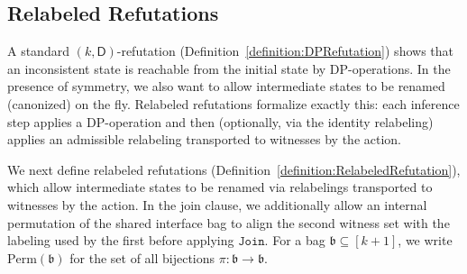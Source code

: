\documentclass[11pt,a4paper]{article}
\newcommand{\treewidthvalue}{k}
\newcommand{\abag}{\mathfrak{b}}
\newcommand{\jointype}{\mathtt{Join}}
\newcommand{\allwitnesses}{\mathcal{W}}
\newcommand{\dpcore}{\mathsf{D}}
\newcommand{\witnessset}{S}
\newcommand{\decompositionclass}{\mathsf{C}}
\newcommand{\realizationclass}{\mathcal{A}}
\newcommand{\relabelingfunction}{f}
\newcommand{\relabelclass}{\mathcal{F}}
\newcommand{\action}{\rho}
\newcommand{\relabelpair}{\rho}
\begin{document}
\subsection{Relabeled Refutations}

A standard $(\treewidthvalue,\dpcore)$-refutation (Definition~\ref{definition:DPRefutation}) shows that an inconsistent state is reachable from the initial state by DP-operations. In the presence of symmetry, we also want to allow intermediate states to be renamed (canonized) on the fly. Relabeled refutations formalize exactly this: each inference step applies a DP-operation and then (optionally, via the identity relabeling) applies an admissible relabeling transported to witnesses by the action.



We next define relabeled refutations (Definition~\ref{definition:RelabeledRefutation}), which allow intermediate states to be renamed via relabelings transported to witnesses by the action.
In the join clause, we additionally allow an internal permutation of the shared interface bag to align the second witness set with the labeling used by the first before applying $\jointype$.
For a bag $\abag\subseteq [\treewidthvalue+1]$, we write $\mathrm{Perm}(\abag)$ for the set of all bijections $\pi:\abag\to \abag$.
\end{document}

